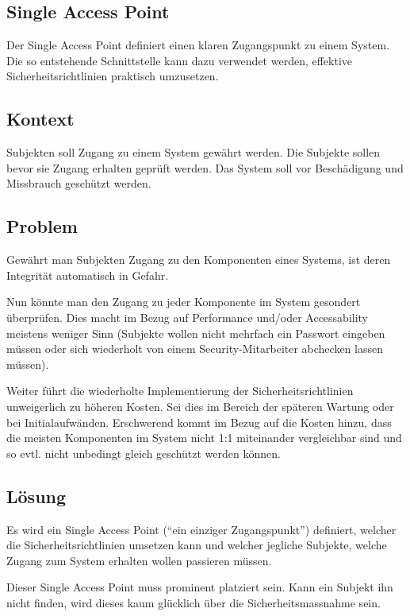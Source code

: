 \subsection{Single Access Point}
\label{sec:singleaccesspoint}

Der Single Access Point definiert einen klaren Zugangspunkt zu einem System. Die so entstehende Schnittstelle kann dazu verwendet werden, effektive Sicherheitsrichtlinien praktisch umzusetzen.

\subsection*{Kontext}
Subjekten soll Zugang zu einem System gewährt werden. Die Subjekte sollen bevor sie Zugang erhalten geprüft werden. Das System soll vor Beschädigung und Missbrauch geschützt werden.

\subsection*{Problem}
Gewährt man Subjekten Zugang zu den Komponenten eines Systems, ist deren Integrität automatisch in Gefahr.

Nun könnte man den Zugang zu jeder Komponente im System gesondert überprüfen. Dies macht im Bezug auf Performance und/oder Accessability meistens weniger Sinn (Subjekte wollen nicht mehrfach ein Passwort eingeben müssen oder sich wiederholt von einem Security-Mitarbeiter abchecken lassen müssen).

Weiter führt die wiederholte Implementierung der Sicherheitsrichtlinien unweigerlich zu höheren Kosten. Sei dies im Bereich der späteren Wartung oder bei Initialaufwänden. Erschwerend kommt im Bezug auf die Kosten hinzu, dass die meisten Komponenten im System nicht 1:1 miteinander vergleichbar sind und so evtl. nicht unbedingt gleich geschützt werden können.


\subsection*{Lösung}
Es wird ein Single Access Point (``ein einziger Zugangspunkt'') definiert, welcher die Sicherheitsrichtlinien umsetzen kann und welcher jegliche Subjekte, welche Zugang zum System erhalten wollen passieren müssen.

Dieser Single Access Point muss prominent platziert sein. Kann ein Subjekt ihn nicht finden, wird dieses kaum glücklich über die Sicherheitsmassnahme sein.

